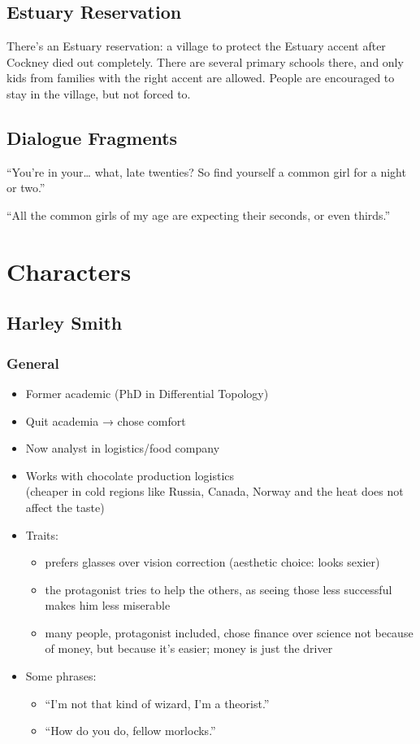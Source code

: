 \documentclass[12pt]{article}
\begin{document}
\subsection{Estuary Reservation}

There’s an Estuary reservation: a village to protect the Estuary accent after Cockney died out completely. There are several primary schools there, and only kids from families with the right accent are allowed. People are encouraged to stay in the village, but not forced to.

\subsection{Dialogue Fragments}

“You’re in your… what, late twenties? So find yourself a common girl for a night or two.”

“All the common girls of my age are expecting their seconds, or even thirds.”

\section{Characters}

\subsection{Harley Smith}
\subsubsection{General}

\begin{itemize}
  \item Former academic (PhD in Differential Topology)
  \item Quit academia → chose comfort
  \item Now analyst in logistics/food company
  \item Works with chocolate production logistics\\ (cheaper in cold regions like Russia, Canada, Norway and the heat does not affect the taste)
  \item Traits:
  \begin{itemize}
    \item prefers glasses over vision correction (aesthetic choice: looks sexier)
    \item the protagonist tries to help the others, as seeing those less successful makes him less miserable
    \item many people, protagonist included, chose finance over science not because of money, but because it’s easier; money is just the driver
  \end{itemize}
  \item Some phrases:
  \begin{itemize}
    \item “I’m not that kind of wizard, I’m a theorist.”
    \item “How do you do, fellow morlocks.”
  \end{itemize}
\end{itemize}
\end{document}
